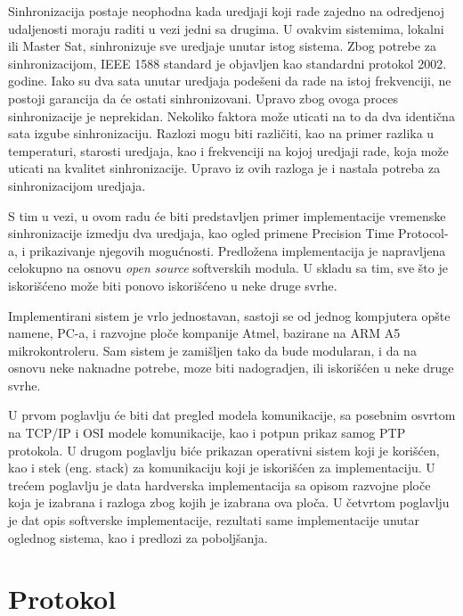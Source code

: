 \documentclass[a4paper,12pt, master]{etf}
\begin{document}
	Sinhronizacija postaje neophodna kada uredjaji koji rade zajedno na
	odredjenoj udaljenosti moraju raditi u vezi jedni sa drugima. U ovakvim
	sistemima, lokalni ili Master Sat, sinhronizuje sve uredjaje unutar istog
	sistema. Zbog potrebe za sinhronizacijom, IEEE 1588 standard je objavljen
    kao standardni protokol 2002. godine. Iako su dva sata unutar uredjaja
    pode\v{s}eni da rade na istoj frekvenciji, ne postoji garancija da \'{c}e
    ostati sinhronizovani. Upravo zbog ovoga proces sinhronizacije je
    neprekidan. Nekoliko faktora mo\v{z}e uticati na to da dva identi\v{c}na
    sata izgube sinhronizaciju. Razlozi mogu biti razli\v{c}iti, kao na primer
    razlika u temperaturi, starosti uredjaja, kao i frekvenciji na kojoj
    uredjaji rade, koja mo\v{z}e uticati na kvalitet sinhronizacije. Upravo iz
    ovih razloga je i nastala potreba za sinhronizacijom uredjaja.

	S tim u vezi, u ovom radu \'{c}e biti predstavljen primer implementacije
	vremenske sinhronizacije izmedju dva uredjaja, kao ogled primene Precision
	Time Protocol-a, i prikazivanje njegovih mogu\'{c}nosti. Predlo\v{z}ena
	implementacija je napravljena celokupno na osnovu \textit{open source}
	softverskih modula. U skladu sa tim, sve \v{s}to je iskori\v{s}\'{c}eno
    mo\v{z}e biti ponovo iskori\v{s}\'{c}eno u neke druge svrhe.

	Implementirani sistem je vrlo jednostavan, sastoji se od jednog kompjutera
	op\v{s}te namene, PC-a, i razvojne plo\v{c}e kompanije Atmel, bazirane na
	ARM A5 mikrokontroleru. Sam sistem je zami\v{s}ljen tako da bude modularan,
	i da na osnovu neke naknadne potrebe, moze biti nadogradjen, ili
	iskori\v{s}\'{c}en u neke druge svrhe.

	U prvom poglavlju \'{c}e biti dat pregled modela komunikacije, sa posebnim
	osvrtom na TCP/IP i OSI modele komunikacije, kao i potpun prikaz samog PTP
	protokola. U drugom poglavlju bi\'{c}e prikazan operativni sistem koji
	je kori\v{s}\'{c}en, kao i stek (eng\@. stack) za komunikaciju koji je
	iskori\v{s}\'{c}en za implementaciju. U tre\'{c}em poglavlju je data
	hardverska implementacija sa opisom razvojne plo\v{c}e koja je izabrana i
	razloga zbog kojih je izabrana ova plo\v{c}a. U \v{c}etvrtom poglavlju je
	dat opis softverske implementacije, rezultati same implementacije unutar
	oglednog sistema, kao i predlozi za pobolj\v{s}anja.

	\newpage

	\chapter{Protokol}
\end{document}
